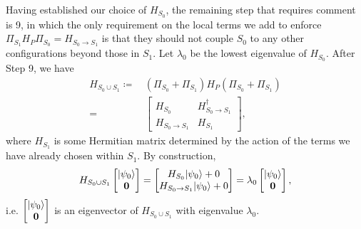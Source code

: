 \documentclass[
  reprint,            %
  amsmath,amssymb,
  aps,
  superscriptaddress, %
  longbibliography
]{revtex4-2}
\theoremstyle{definition}
\begin{document}
Having established our choice of $H_{S_0}$, the remaining step that requires comment is 9, in which the only requirement on the local terms we add to enforce $\Pi_{S_1}H_P\Pi_{S_0}=H_{S_0\rightarrow S_1}$ is that they should not couple $S_0$ to any other configurations beyond those in $S_1$.
Let $\lambda_0$ be the lowest eigenvalue of $H_{S_0}$.
After Step 9, we have
\begin{equation}
\begin{split}
    H_{S_0\cup S_1}
    \coloneqq\,&(\Pi_{S_0}+\Pi_{S_1})H_P(\Pi_{S_0}+\Pi_{S_1}) \\
    =\,&
    \begin{bmatrix}
        H_{S_0} & H_{S_0\rightarrow S_1}^\dagger \\
        H_{S_0\rightarrow S_1} & H_{S_1}
    \end{bmatrix},
\end{split}
\end{equation}
where $H_{S_1}$ is some Hermitian matrix determined by the action of the terms we have already chosen within $S_1$.
By construction,
\begin{equation}
    H_{S_0\cup S_1}\begin{bmatrix}
        |\psi_0\rangle \\
        \bf{0}
    \end{bmatrix}
    =
    \begin{bmatrix}
        H_{S_0}|\psi_0\rangle+ 0 \\
        H_{S_0\rightarrow S_1}|\psi_0\rangle + 0
    \end{bmatrix}
    =
    \lambda_0\begin{bmatrix}
        |\psi_0\rangle \\
        \bf{0}
    \end{bmatrix},
\end{equation}
i.e. $\begin{bmatrix}|\psi_0\rangle\\\bf{0}\end{bmatrix}$ is an eigenvector of $H_{S_0\cup S_1}$ with eigenvalue $\lambda_0$.
\end{document}
